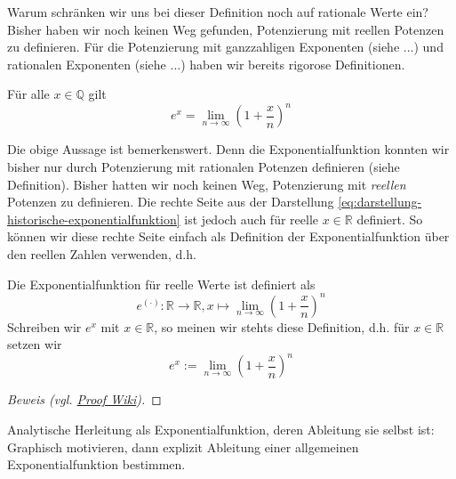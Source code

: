 Warum schränken wir uns bei dieser Definition noch auf rationale Werte ein? Bisher haben wir noch keinen Weg gefunden, Potenzierung mit reellen Potenzen zu definieren. Für die Potenzierung mit ganzzahligen Exponenten (siehe ...) und rationalen Exponenten (siehe ...) haben wir bereits rigorose Definitionen. 

\begin{theorem}
    Für alle \(x \in \mathbb Q\) gilt 
    \begin{equation}\label{eq:darstellung-historische-exponentialfunktion}
        e^x = \lim_{n\to\infty}\left(1 + \frac{x}{n}\right)^n 
    \end{equation}
\end{theorem}
Die obige Aussage ist bemerkenswert. Denn die Exponentialfunktion konnten wir bisher nur durch Potenzierung mit rationalen Potenzen definieren (siehe Definition). Bisher hatten wir noch keinen Weg, Potenzierung mit \textit{reellen} Potenzen zu definieren. Die rechte Seite aus der Darstellung \eqref{eq:darstellung-historische-exponentialfunktion} ist jedoch auch für reelle \(x \in \mathbb R\) definiert. So können wir diese rechte Seite einfach als Definition der Exponentialfunktion über den reellen Zahlen verwenden, d.h.
\begin{definition}
    Die Exponentialfunktion für reelle Werte ist definiert als 
    \begin{equation*}
        e^{(\cdot)}: \mathbb R \to \mathbb R, x \mapsto \lim_{n\to\infty}\left(1 + \frac{x}{n}\right)^n 
    \end{equation*}
    Schreiben wir \(e^x\) mit \(x \in \mathbb R\), so meinen wir stehts diese Definition, d.h. für \(x \in \mathbb R\) setzen wir
    \begin{equation*}
        e^x := \lim_{n\to\infty}\left(1 + \frac{x}{n}\right)^n 
    \end{equation*}
\end{definition}

\begin{theorem}
    
\end{theorem}
\begin{proof}[Beweis (vgl. \href{https://proofwiki.org/wiki/Derivative_of_Exponential_at_Zero}{Proof Wiki})]
    
\end{proof}

Analytische Herleitung als Exponentialfunktion, deren Ableitung sie selbst ist: Graphisch motivieren, dann explizit Ableitung einer allgemeinen Exponentialfunktion bestimmen. 

